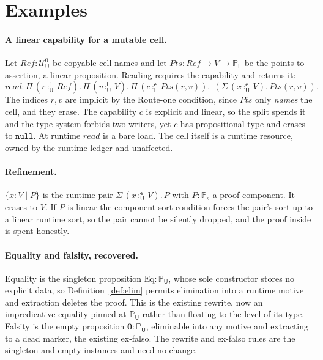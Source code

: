 \documentclass[11pt]{article}
\newcommand{\Ty}[2]{\mathcal{U}^{#2}_{#1}}       %
\newcommand{\Prop}[1]{\mathbb{P}_{#1}}            %
\newcommand{\zero}{\mathbf{0}}                    %
\newcommand{\im}{\mathsf{i}}                      %
\newcommand{\ex}{\mathsf{e}}                      %
\newcommand{\bind}[3]{#1\,{:}^{#2}_{#3}\,}        %
\newcommand{\Pifn}[4]{\Pi\,(\bind{#1}{#2}{#3}#4).\,}
\newcommand{\Sgfn}[4]{\Sigma\,(\bind{#1}{#2}{#3}#4).\,}
\newcommand{\nul}{\mathtt{null}}
\theoremstyle{definition}
\theoremstyle{plain}
\begin{document}
\section{Examples}\label{sec:examples}

\paragraph{A linear capability for a mutable cell.}
Let $\mathit{Ref}:\Ty{\mathsf{U}}{0}$ be copyable cell names and let
$\mathit{Pts}:\mathit{Ref}\to V\to\Prop{\mathsf{L}}$ be the points-to
assertion, a linear proposition. Reading requires the capability and returns it:
\[
  \mathit{read} :
  \Pifn{r}{\im}{\mathsf{U}}{\mathit{Ref}}
  \Pifn{v}{\im}{\mathsf{U}}{V}
  \Pifn{c}{\ex}{\mathsf{L}}{\mathit{Pts}(r,v)}\;
  (\Sgfn{x}{\ex}{\mathsf{U}}{V}\mathit{Pts}(r,v)).
\]
The indices $r,v$ are implicit by the Route-one condition, since $\mathit{Pts}$
only \emph{names} the cell, and they erase. The capability $c$ is explicit and
linear, so the split spends it and the type system forbids two writers, yet $c$
has propositional type and erases to $\nul$. At runtime $\mathit{read}$ is a bare
load. The cell itself is a runtime resource, owned by the runtime ledger and
unaffected.

\paragraph{Refinement.}
$\{x:V\mid P\}$ is the runtime pair $\Sgfn{x}{\ex}{\mathsf{U}}{V}P$ with
$P:\Prop{s}$ a proof component. It erases to $V$. If $P$ is linear the
component-sort condition forces the pair's sort up to a linear runtime sort, so the
pair cannot be silently dropped, and the proof inside is spent honestly.

\paragraph{Equality and falsity, recovered.}
Equality is the singleton proposition $\mathrm{Eq}:\Prop{\mathsf{U}}$, whose sole
constructor stores no explicit data, so Definition~\ref{def:elim} permits
elimination into a runtime motive and extraction deletes the proof. This is the
existing rewrite, now an impredicative equality pinned at $\Prop{\mathsf{U}}$
rather than floating to the level of its type. Falsity is the empty proposition
$\zero:\Prop{\mathsf{U}}$, eliminable into any motive and extracting to a dead
marker, the existing ex-falso. The rewrite and ex-falso rules are the singleton
and empty instances and need no change.
\end{document}
